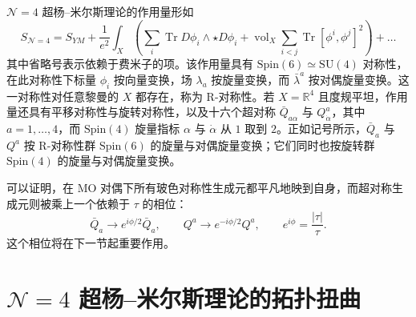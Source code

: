 \documentclass[11pt,a4paper,UTF8]{ctexart}
\begin{document}
$\mathcal{N}=4$ 超杨–米尔斯理论的作用量形如
\[
    S_{\mathcal{N}=4}=S_{YM}+\frac{1}{e^{2}}\int_{X}\left(\sum_{i}\operatorname{Tr}D\phi_{i}\wedge\star D\phi_{i}
    +\operatorname{vol}_{X}\sum_{i<j}\operatorname{Tr}[\phi^{i},\phi^{j}]^{2}\right)+\ldots
\]
其中省略号表示依赖于费米子的项。该作用量具有 $\mathrm{Spin}(6)\simeq \mathrm{SU}(4)$ 对称性，在此对称性下标量 $\phi_{i}$ 按向量变换，场 $\lambda_{a}$ 按旋量变换，而 $\bar{\lambda}^{a}$ 按对偶旋量变换。这一对称性对任意黎曼的 $X$ 都存在，称为 R-对称性。若 $X=\mathbb{R}^{4}$ 且度规平坦，作用量还具有平移对称性与旋转对称性，以及十六个超对称 $\bar{Q}_{a\alpha}$ 与 $Q^{a}_{\dot{\alpha}}$，其中 $a=1,\ldots,4$，而 $\mathrm{Spin}(4)$ 旋量指标 $\alpha$ 与 $\dot{\alpha}$ 从 $1$ 取到 $2$。正如记号所示，$\bar{Q}_{a}$ 与 $Q^{a}$ 按 R-对称性群 $\mathrm{Spin}(6)$ 的旋量与对偶旋量变换；它们同时也按旋转群 $\mathrm{Spin}(4)$ 的旋量与对偶旋量变换。

可以证明，在 MO 对偶下所有玻色对称性生成元都平凡地映到自身，而超对称生成元则被乘上一个依赖于 $\tau$ 的相位：
\[
    \bar{Q}_{a}\to e^{i\phi/2}\bar{Q}_{a},\qquad
    Q^{a}\to e^{-i\phi/2}Q^{a},\qquad
    e^{i\phi}=\frac{|\tau|}{\tau}.
\]
这个相位将在下一节起重要作用。

\section{$\mathcal{N}=4$ 超杨–米尔斯理论的拓扑扭曲}
\end{document}
